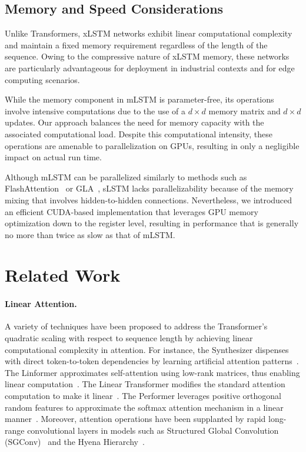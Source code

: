 \subsection{Memory and Speed Considerations}

Unlike Transformers, xLSTM networks exhibit linear computational complexity and maintain a fixed memory requirement regardless of the length of the sequence. Owing to the compressive nature of xLSTM memory, these networks are particularly advantageous for deployment in industrial contexts and for edge computing scenarios.

While the memory component in mLSTM is parameter-free, its operations involve intensive computations due to the use of a $d \times d$ memory matrix and $d \times d$ updates. Our approach balances the need for memory capacity with the associated computational load. Despite this computational intensity, these operations are amenable to parallelization on GPUs, resulting in only a negligible impact on actual run time.

Although mLSTM can be parallelized similarly to methods such as FlashAttention~\citep{Dao:22,Dao:23} or GLA~\citep{Yang:23arxiv}, sLSTM lacks parallelizability because of the memory mixing that involves hidden-to-hidden connections. Nevertheless, we introduced an efficient CUDA-based implementation that leverages GPU memory optimization down to the register level, resulting in performance that is generally no more than twice as slow as that of mLSTM.

\section{Related Work}
\label{sec:related}

\paragraph{Linear Attention.} A variety of techniques have been proposed to address the Transformer’s quadratic scaling with respect to sequence length by achieving linear computational complexity in attention. For instance, the Synthesizer dispenses with direct token-to-token dependencies by learning artificial attention patterns~\citep{Tay:20arxiv}. The Linformer approximates self-attention using low-rank matrices, thus enabling linear computation~\citep{Wang:20arxiv}. The Linear Transformer modifies the standard attention computation to make it linear~\citep{Katharopoulos:20}. The Performer leverages positive orthogonal random features to approximate the softmax attention mechanism in a linear manner~\citep{Choromanski:21}. Moreover, attention operations have been supplanted by rapid long-range convolutional layers in models such as Structured Global Convolution (SGConv)~\citep{Li:22} and the Hyena Hierarchy~\citep{Poli:23}.


